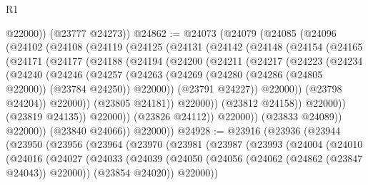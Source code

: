 \begin{lexlean}{R1}
\begin{coremodule}
          @22000))
      (@23777 @24273))
@24862 := @24073
    (@24079
      (@24085
        (@24096
          (@24102
            (@24108
              (@24119
                (@24125
                  (@24131
                    (@24142
                      (@24148
                        (@24154
                          (@24165
                            (@24171
                              (@24177
                                (@24188
                                  (@24194
                                    (@24200
                                      (@24211
                                        (@24217
                                          (@24223
                                            (@24234
                                              (@24240
                                                (@24246
                                                  (@24257
                                                    (@24263
                                                      (@24269
                                                        (@24280
                                                          (@24286 (@24805 @22000))
                                                          (@23784 @24250))
                                                        @22000))
                                                    (@23791 @24227))
                                                  @22000))
                                              (@23798 @24204))
                                            @22000))
                                        (@23805 @24181))
                                      @22000))
                                  (@23812 @24158))
                                @22000))
                            (@23819 @24135))
                          @22000))
                      (@23826 @24112))
                    @22000))
                (@23833 @24089))
              @22000))
          (@23840 @24066))
        @22000))
@24928 := @23916
    (@23936
      (@23944
        (@23950
          (@23956
            (@23964
              (@23970
                (@23981
                  (@23987
                    (@23993
                      (@24004
                        (@24010
                          (@24016
                            (@24027
                              (@24033
                                (@24039
                                  (@24050
                                    (@24056 (@24062 (@24862 (@23847 @24043)) @22000))
                                    (@23854 @24020))
                                  @22000))

\end{coremodule}
\end{lexlean}
